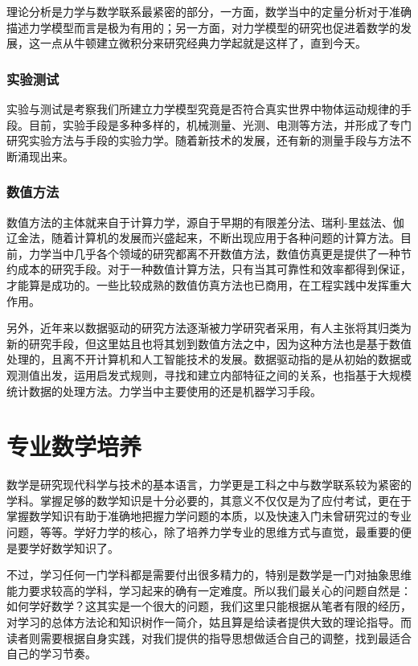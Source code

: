 理论分析是力学与数学联系最紧密的部分，一方面，数学当中的定量分析对于准确描述力学模型而言是极为有用的；另一方面，对力学模型的研究也促进着数学的发展，这一点从牛顿建立微积分来研究经典力学起就是这样了，直到今天。

\subsubsection{实验测试}

实验与测试是考察我们所建立力学模型究竟是否符合真实世界中物体运动规律的手段。目前，实验手段是多种多样的，机械测量、光测、电测等方法，并形成了专门研究实验方法与手段的实验力学。随着新技术的发展，还有新的测量手段与方法不断涌现出来。

\subsubsection{数值方法}

数值方法的主体就来自于计算力学，源自于早期的有限差分法、瑞利-里兹法、伽辽金法，随着计算机的发展而兴盛起来，不断出现应用于各种问题的计算方法。目前，力学当中几乎各个领域的研究都离不开数值方法，数值仿真更是提供了一种节约成本的研究手段。对于一种数值计算方法，只有当其可靠性和效率都得到保证，才能算是成功的。一些比较成熟的数值仿真方法也已商用，在工程实践中发挥重大作用。

另外，近年来以数据驱动的研究方法逐渐被力学研究者采用，有人主张将其归类为新的研究手段，但这里姑且也将其划到数值方法之中，因为这种方法也是基于数值处理的，且离不开计算机和人工智能技术的发展。数据驱动指的是从初始的数据或观测值出发，运用启发式规则，寻找和建立内部特征之间的关系，也指基于大规模统计数据的处理方法。力学当中主要使用的还是机器学习手段。
\newpage

\section{专业数学培养}

数学是研究现代科学与技术的基本语言，力学更是工科之中与数学联系较为紧密的学科。掌握足够的数学知识是十分必要的，其意义不仅仅是为了应付考试，更在于掌握数学知识有助于准确地把握力学问题的本质，以及快速入门未曾研究过的专业问题，等等。学好力学的核心，除了培养力学专业的思维方式与直觉，最重要的便是要学好数学知识了。

不过，学习任何一门学科都是需要付出很多精力的，特别是数学是一门对抽象思维能力要求较高的学科，学习起来的确有一定难度。所以我们最关心的问题自然是：如何学好数学？这其实是一个很大的问题，我们这里只能根据从笔者有限的经历，对学习的总体方法论和知识树作一简介，姑且算是给读者提供大致的理论指导。而读者则需要根据自身实践，对我们提供的指导思想做适合自己的调整，找到最适合自己的学习节奏。

